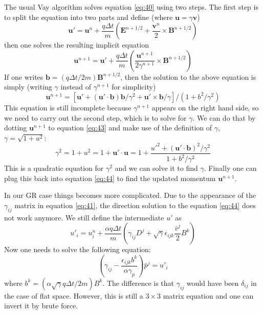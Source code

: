 The usual Vay algorithm solves equation \eqref{eq:40} using two steps. The first
step is to split the equation into two parts and define (where $\mathbf{u} =
\gamma \mathbf{v}$)
\begin{equation}
  \label{eq:42}
  \mathbf{u}' = \mathbf{u}^n + \frac{q\Delta t}{m}\left( \mathbf{E}^{n+1/2} + \frac{\mathbf{v}^n}{2}\times \mathbf{B}^{n+1/2} \right)
\end{equation}
then one solves the resulting implicit equation
\begin{equation}
  \label{eq:43}
  \mathbf{u}^{n+1} = \mathbf{u}' + \frac{q\Delta t}{m}\left( \frac{\mathbf{u}^{n+1}}{2\gamma^{n+1}}\times \mathbf{B}^{n+1/2} \right)
\end{equation}
If one writes $\mathbf{b} = (q\Delta t/2m)\mathbf{B}^{n+1/2}$, then
the solution to the above equation is simply (writing $\gamma$ instead of
$\gamma^{n+1}$ for simplicity)
\begin{equation}
  \label{eq:44}
  \mathbf{u}^{n+1} = \left[ \mathbf{u}' + (\mathbf{u}'\cdot \mathbf{b})\mathbf{b}/\gamma^2 + \mathbf{u}'\times \mathbf{b}/\gamma \right] / (1 + b^2/\gamma^2)
\end{equation}
This equation is still incomplete because $\gamma^{n+1}$ appears on the right
hand side, so we need to carry out the second step, which is to solve for
$\gamma$. We can do that by dotting $\mathbf{u}^{n+1}$ to equation \eqref{eq:43}
and make use of the definition of $\gamma$, $\gamma = \sqrt{1 + u^2}$:
\begin{equation}
  \label{eq:45}
  \gamma^2 = 1 + u^2 = 1 + \mathbf{u}'\cdot \mathbf{u} = 1 + \frac{u'^2 + (\mathbf{u}'\cdot \mathbf{b})^2/\gamma^2}{1 + b^2/\gamma^2}
\end{equation}
This is a quadratic equation for $\gamma^2$ and we can solve it to find
$\gamma$. Finally one can plug this back into equation \eqref{eq:44} to find the
updated momentum $\mathbf{u}^{n+1}$.

In our GR case things becomes more complicated. Due to the appearance of
the $\gamma_{ij}$ matrix in equation \eqref{eq:41}, the direction solution to the
equation \eqref{eq:44} does not work anymore. We still define the intermediate
$u'$ as
\begin{equation}
  \label{eq:47}
  u'_i = u_i^n + \frac{\alpha q\Delta t}{m}\left(\gamma_{ij}D^j + \sqrt{\gamma}\epsilon_{ijk}\frac{\bar{v}^j}{2}B^k\right)
\end{equation}
Now one needs to solve the following equation:
\begin{equation}
  \label{eq:46}
  \left( \gamma_{ij} - \frac{\epsilon_{ijk}b^k}{\alpha\gamma_p} \right)\bar{p}^j = u'_i
\end{equation}
where $b^k = (\alpha\sqrt{\gamma} q \Delta t/2m)B^{k}$. The difference is that
$\gamma_{ij}$ would have been $\delta_{ij}$ in the case of flat space. However,
this is still a $3\times 3$ matrix equation and one can invert it by brute
force.

